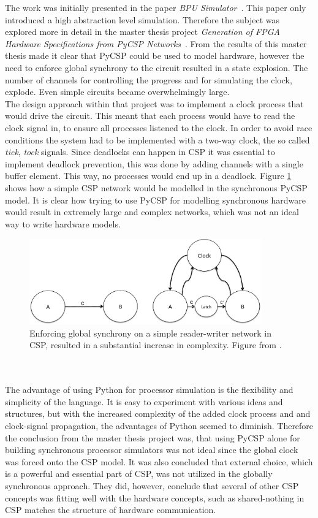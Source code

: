 The work was initially presented in the paper \textit{BPU Simulator}~\cite{Rehr2013}. This paper only introduced a high abstraction level simulation. Therefore the subject was explored more in detail in the master thesis project \textit{Generation of FPGA Hardware
Specifications from PyCSP Networks}~\cite{Skaarup14}. From the results of this master thesis made it clear that PyCSP could be used to model hardware, however the need to enforce global synchrony to the circuit resulted in a state explosion. The number of channels for controlling the progress and for simulating the clock, explode. Even simple circuits became overwhelmingly large.\\

The design approach within that project was to implement a clock process that would drive the circuit. This meant that each process would have to read the clock signal in, to ensure all processes listened to the clock. In order to avoid race conditions the system had to be implemented with a two-way clock, the so called \textit{tick}, \textit{tock} signals. Since deadlocks can happen in CSP it was essential to implement deadlock prevention, this was done by adding channels with a single buffer element. This way, no processes would end up in a deadlock. Figure \ref{fig:sme:clock_latch} shows how a simple CSP network would be modelled in the synchronous PyCSP model. It is clear how trying to use PyCSP for modelling synchronous hardware would result in extremely large and complex networks, which was not an ideal way to write hardware models.
\begin{figure}[h!]
\centering
\includegraphics[width=10.0cm]{figures/clocked.pdf}
\caption{Enforcing global synchrony on a simple reader-writer network in CSP, resulted in a substantial increase in complexity. Figure from \cite{Vinter2014}.}
\label{fig:sme:clock_latch}
\end{figure}
\\\\
The advantage of using Python for processor simulation is the flexibility and simplicity of the language. It is easy to experiment with various ideas and structures, but with the increased complexity of the added clock process and and clock-signal propagation, the advantages of Python seemed to diminish. Therefore the conclusion from the master thesis project was, that using PyCSP alone for building synchronous processor simulators was not ideal since the global clock was forced onto the CSP model. It was also concluded that external choice, which is a powerful and essential part of CSP, was not utilized in the globally synchronous approach. They did, however, conclude that several of other CSP concepts was fitting well with the hardware concepts, such as shared-nothing in CSP matches the structure of hardware communication.

